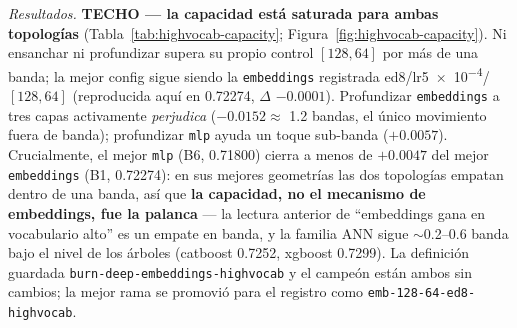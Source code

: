 \documentclass[11pt]{article}
\begin{document}
\emph{Resultados.} \textbf{TECHO --- la capacidad está saturada para ambas
topologías} (Tabla~\ref{tab:highvocab-capacity}; Figura~\ref{fig:highvocab-capacity}).
Ni ensanchar ni profundizar supera su propio control $[128,64]$ por más de una
banda; la mejor config sigue siendo la \texttt{embeddings} registrada
ed8/lr\num{5e-4}/$[128,64]$ (reproducida aquí en \num{0.72274}, $\Delta$
$-\num{0.0001}$). Profundizar \texttt{embeddings} a tres capas activamente
\emph{perjudica} ($-\num{0.0152}\approx$ 1.2 bandas, el único movimiento fuera de
banda); profundizar \texttt{mlp} ayuda un toque sub-banda ($+\num{0.0057}$).
Crucialmente, el mejor \texttt{mlp} (B6, \num{0.71800}) cierra a menos de
$+\num{0.0047}$ del mejor \texttt{embeddings} (B1, \num{0.72274}): en sus mejores
geometrías las dos topologías empatan dentro de una banda, así que \textbf{la
capacidad, no el mecanismo de embeddings, fue la palanca} --- la lectura anterior
de ``embeddings gana en vocabulario alto'' es un empate en banda, y la familia ANN
sigue $\sim$0.2--0.6 banda bajo el nivel de los árboles (catboost \num{0.7252},
xgboost \num{0.7299}). La definición guardada
\texttt{burn-deep-embeddings-highvocab} y el campeón están ambos sin cambios; la
mejor rama se promovió para el registro como \texttt{emb-128-64-ed8-highvocab}.
\end{document}
